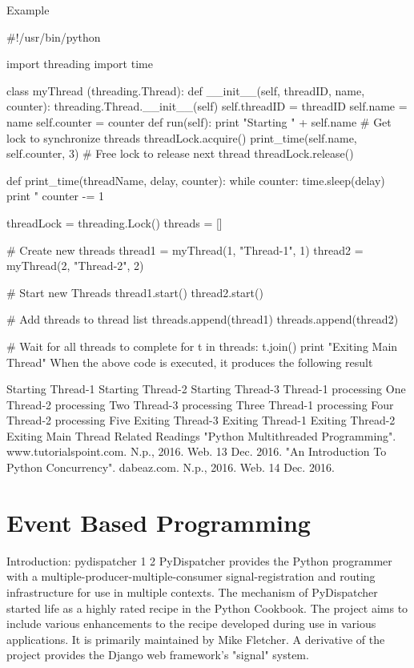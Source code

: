 Example

#!/usr/bin/python

import threading
import time

class myThread (threading.Thread):
    def __init__(self, threadID, name, counter):
        threading.Thread.__init__(self)
        self.threadID = threadID
        self.name = name
        self.counter = counter
    def run(self):
        print "Starting " + self.name
        # Get lock to synchronize threads
        threadLock.acquire()
        print_time(self.name, self.counter, 3)
        # Free lock to release next thread
        threadLock.release()

def print_time(threadName, delay, counter):
    while counter:
        time.sleep(delay)
        print "%
        counter -= 1

threadLock = threading.Lock()
threads = []

# Create new threads
thread1 = myThread(1, "Thread-1", 1)
thread2 = myThread(2, "Thread-2", 2)

# Start new Threads
thread1.start()
thread2.start()

# Add threads to thread list
threads.append(thread1)
threads.append(thread2)

# Wait for all threads to complete
for t in threads:
    t.join()
print "Exiting Main Thread"
When the above code is executed, it produces the following result

Starting Thread-1
Starting Thread-2
Starting Thread-3
Thread-1 processing One
Thread-2 processing Two
Thread-3 processing Three
Thread-1 processing Four
Thread-2 processing Five
Exiting Thread-3
Exiting Thread-1
Exiting Thread-2
Exiting Main Thread
Related Readings
"Python Multithreaded Programming". www.tutorialspoint.com. N.p., 2016. Web. 13 Dec. 2016.
"An Introduction To Python Concurrency". dabeaz.com. N.p., 2016. Web. 14 Dec. 2016.

\section{Event Based Programming}

Introduction: pydispatcher 1 2
PyDispatcher provides the Python programmer with a multiple-producer-multiple-consumer signal-registration and routing infrastructure for use in multiple contexts. The mechanism of PyDispatcher started life as a highly rated recipe in the Python Cookbook. The project aims to include various enhancements to the recipe developed during use in various applications. It is primarily maintained by Mike Fletcher. A derivative of the project provides the Django web framework's "signal" system.

